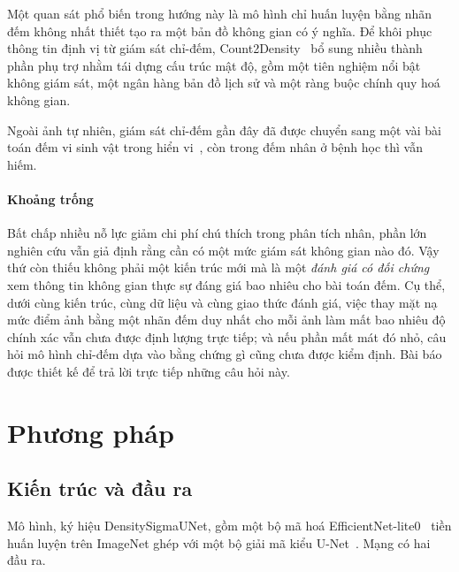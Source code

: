 \documentclass[preprint,12pt]{elsarticle}
\begin{document}
Một quan sát phổ biến trong hướng này là mô hình chỉ huấn luyện bằng nhãn đếm không nhất thiết tạo ra một bản đồ
không gian có ý nghĩa. Để khôi phục thông tin định vị từ giám sát chỉ-đếm, Count2Density~\cite{count2density} bổ
sung nhiều thành phần phụ trợ nhằm tái dựng cấu trúc mật độ, gồm một tiên nghiệm nổi bật không giám sát, một ngân
hàng bản đồ lịch sử và một ràng buộc chính quy hoá không gian.

Ngoài ảnh tự nhiên, giám sát chỉ-đếm gần đây đã được chuyển sang một vài bài toán đếm vi sinh vật trong hiển
vi~\cite{microvit}, còn trong đếm nhân ở bệnh học thì vẫn hiếm.

\paragraph{Khoảng trống} Bất chấp nhiều nỗ lực giảm chi phí chú thích trong phân tích nhân, phần lớn nghiên cứu
vẫn giả định rằng cần có một mức giám sát không gian nào đó. Vậy thứ còn thiếu không phải một kiến trúc mới mà là
một \emph{đánh giá có đối chứng} xem thông tin không gian thực sự đáng giá bao nhiêu cho bài toán đếm. Cụ thể,
dưới cùng kiến trúc, cùng dữ liệu và cùng giao thức đánh giá, việc thay mặt nạ mức điểm ảnh bằng một nhãn đếm duy
nhất cho mỗi ảnh làm mất bao nhiêu độ chính xác vẫn chưa được định lượng trực tiếp; và nếu phần mất mát đó nhỏ,
câu hỏi mô hình chỉ-đếm dựa vào bằng chứng gì cũng chưa được kiểm định. Bài báo được thiết kế để trả lời trực
tiếp những câu hỏi này.

\section{Phương pháp}\label{sec:method}

\subsection{Kiến trúc và đầu ra}
Mô hình, ký hiệu DensitySigmaUNet, gồm một bộ mã hoá EfficientNet-lite0~\cite{efficientnet} tiền huấn luyện trên
ImageNet ghép với một bộ giải mã kiểu U-Net~\cite{unet}. Mạng có hai đầu ra.
\end{document}

